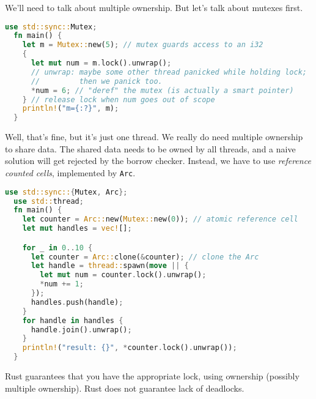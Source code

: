 We'll need to talk about multiple ownership. But let's talk about mutexes first.
\begin{lstlisting}[language=Rust]
  use std::sync::Mutex;
  fn main() {
    let m = Mutex::new(5); // mutex guards access to an i32
    {
      let mut num = m.lock().unwrap();
      // unwrap: maybe some other thread panicked while holding lock;
      //         then we panick too.
      *num = 6; // "deref" the mutex (is actually a smart pointer)
    } // release lock when num goes out of scope
    println!("m={:?}", m);
  }
\end{lstlisting}
Well, that's fine, but it's just one thread. We really do need multiple ownership
to share data. The shared data needs to be owned by all threads, and a naive solution
will get rejected by the borrow checker. Instead, we have to use \emph{reference counted
  cells}, implemented by {\tt Arc}.
\begin{lstlisting}[language=Rust]
  use std::sync::{Mutex, Arc};
  use std::thread;
  fn main() {
    let counter = Arc::new(Mutex::new(0)); // atomic reference cell
    let mut handles = vec![];

    for _ in 0..10 {
      let counter = Arc::clone(&counter); // clone the Arc
      let handle = thread::spawn(move || {
        let mut num = counter.lock().unwrap();
        *num += 1;
      });
      handles.push(handle);
    }
    for handle in handles {
      handle.join().unwrap();
    }
    println!("result: {}", *counter.lock().unwrap());
  }
\end{lstlisting}
Rust guarantees that you have the appropriate lock, using ownership (possibly multiple ownership).
Rust does not guarantee lack of deadlocks.





